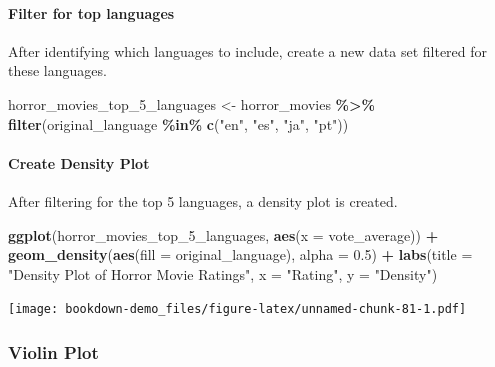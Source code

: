 \documentclass[
  b5paper]{book}
\newenvironment{Shaded}{\begin{snugshade}}{\end{snugshade}}
\newcommand{\AttributeTok}[1]{\textcolor[rgb]{0.13,0.29,0.53}{#1}}
\newcommand{\FloatTok}[1]{\textcolor[rgb]{0.00,0.00,0.81}{#1}}
\newcommand{\FunctionTok}[1]{\textcolor[rgb]{0.13,0.29,0.53}{\textbf{#1}}}
\newcommand{\NormalTok}[1]{#1}
\newcommand{\OtherTok}[1]{\textcolor[rgb]{0.56,0.35,0.01}{#1}}
\newcommand{\SpecialCharTok}[1]{\textcolor[rgb]{0.81,0.36,0.00}{\textbf{#1}}}
\newcommand{\StringTok}[1]{\textcolor[rgb]{0.31,0.60,0.02}{#1}}
\begin{document}
\hypertarget{filter-for-top-languages}{%
\paragraph*{Filter for top languages}\label{filter-for-top-languages}}

After identifying which languages to include, create a new data set filtered for these languages.

\begin{Shaded}
\begin{Highlighting}[]
\NormalTok{horror\_movies\_top\_5\_languages }\OtherTok{\textless{}{-}}\NormalTok{ horror\_movies }\SpecialCharTok{\%\textgreater{}\%}
  \FunctionTok{filter}\NormalTok{(original\_language }\SpecialCharTok{\%in\%} \FunctionTok{c}\NormalTok{(}\StringTok{"en"}\NormalTok{, }\StringTok{"es"}\NormalTok{, }\StringTok{"ja"}\NormalTok{, }\StringTok{"pt"}\NormalTok{))}
\end{Highlighting}
\end{Shaded}

\hypertarget{create-density-plot}{%
\paragraph*{Create Density Plot}\label{create-density-plot}}

After filtering for the top 5 languages, a density plot is created.

\begin{Shaded}
\begin{Highlighting}[]
\FunctionTok{ggplot}\NormalTok{(horror\_movies\_top\_5\_languages, }\FunctionTok{aes}\NormalTok{(}\AttributeTok{x =}\NormalTok{ vote\_average)) }\SpecialCharTok{+}
  \FunctionTok{geom\_density}\NormalTok{(}\FunctionTok{aes}\NormalTok{(}\AttributeTok{fill =}\NormalTok{ original\_language), }\AttributeTok{alpha =} \FloatTok{0.5}\NormalTok{) }\SpecialCharTok{+}
  \FunctionTok{labs}\NormalTok{(}\AttributeTok{title =} \StringTok{"Density Plot of Horror Movie Ratings"}\NormalTok{,}
       \AttributeTok{x =} \StringTok{"Rating"}\NormalTok{,}
       \AttributeTok{y =} \StringTok{"Density"}\NormalTok{)}
\end{Highlighting}
\end{Shaded}

\texttt{[image: bookdown-demo\_files/figure-latex/unnamed-chunk-81-1.pdf]}

\hypertarget{violin-plot}{%
\subsubsection*{Violin Plot}\label{violin-plot}}
\end{document}
